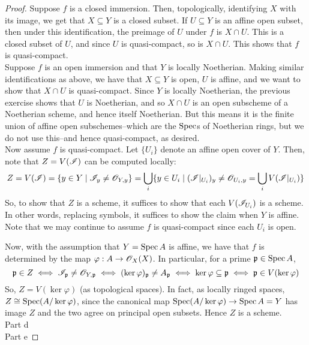\begin{proof}
	Suppose $f$ is a closed immersion. Then, topologically, identifying $X$ with its image, we get that $X \subseteq Y$ is a closed subset. If $U \subseteq Y$ is an affine open subset, then under this identification, the preimage of $U$ under $f$ is $X \cap U$. This is a closed subset of $U$, and since $U$ is quasi-compact, so is $X \cap U$. This shows that $f$ is quasi-compact. \\
	
	Suppose $f$ is an open immersion and that $Y$ is locally Noetherian. Making similar identifications as above, we have that $X \subseteq Y$ is open, $U$ is affine, and we want to show that $X \cap U$ is quasi-compact. Since $Y$ is locally Noetherian, the previous exercise shows that $U$ is Noetherian, and so $X \cap U$ is an open subscheme of a Noetherian scheme, and hence itself Noetherian. But this means it is the finite union of affine open subschemes--which are the $\operatorname{Spec}$s of Noetherian rings, but we do not use this--and hence quasi-compact, as desired. \\
	
	Now assume $f$ is quasi-compact. Let $\{U_i\}$ denote an affine open cover of $Y$. Then, note that $Z = V(\mathscr{I})$ can be computed locally:
	\[ Z = V(\mathscr{I}) = \{ y \in Y \mid \mathscr{I}_y \neq \mathscr{O}_{Y,y} \} = \bigcup_i \{ y \in U_i \mid (\mathscr{I}|_{U_i})_y \neq \mathscr{O}_{U_i,y} = \bigcup_i V(\mathscr{I}|_{U_i}) \} \]
	So, to show that $Z$ is a scheme, it suffices to show that each $V(\mathscr{I}_{U_i})$ is a scheme. In other words, replacing symbols, it suffices to show the claim when $Y$ is affine. Note that we may continue to assume $f$ is quasi-compact since each $U_i$ is open.
	
	Now, with the assumption that $Y = \operatorname{Spec} A$ is affine, we have that $f$ is determined by the map $\varphi : A \to \mathscr{O}_X(X)$. In particular, for a prime $\mathfrak{p} \in \operatorname{Spec} A$,
	\[ \mathfrak{p} \in Z \iff \mathscr{I}_{\mathfrak{p}} \neq \mathscr{O}_{Y,\mathfrak{p}} \iff (\ker\varphi)_{\mathfrak{p}} \neq A_{\mathfrak{p}} \iff \ker\varphi \subseteq \mathfrak{p} \iff \mathfrak{p} \in V(\ker\varphi) \]
	So, $Z = V(\ker\varphi)$ (as topological spaces). In fact, as locally ringed spaces, $Z \cong \operatorname{Spec}(A/\ker\varphi)$, since the canonical map $\operatorname{Spec}(A/\ker\varphi) \to \operatorname{Spec} A = Y$ has image $Z$ and the two agree on principal open subsets. Hence $Z$ is a scheme. \\
	
	Part d \\
	
	Part e
\end{proof}
